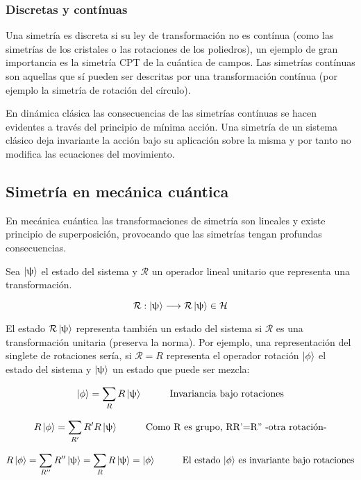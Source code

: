 \documentclass{article}
\begin{document}
\subsubsection{Discretas y contínuas}

Una simetría es discreta si su ley de transformación no es contínua (como las simetrías de los cristales o las rotaciones de los poliedros), un ejemplo de gran importancia es la simetría CPT de la cuántica de campos. Las simetrías contínuas son aquellas que sí pueden ser descritas por una transformación contínua (por ejemplo la simetría de rotación del círculo).

\smallskip
En dinámica clásica las consecuencias de las simetrías contínuas se hacen evidentes a través del principio de mínima acción. Una simetría de un sistema clásico deja invariante la acción bajo su aplicación sobre la misma y por tanto no modifica las ecuaciones del movimiento.

\subsection{Simetría en mecánica cuántica}

En mecánica cuántica las transformaciones de simetría son lineales y existe principio de superposición, provocando que las simetrías tengan profundas consecuencias.

Sea $\ket{\uppsi}$ el estado del sistema y $\mathcal{R}$ un operador lineal unitario que representa una transformación.

$$\mathcal{R}:\ket{\uppsi}\longrightarrow \mathcal{R}\ket{\uppsi}\in \mathcal{H}$$

El estado $\mathcal{R}\ket{\uppsi}$ representa también un estado del sistema si $\mathcal{R}$ es una transformación unitaria (preserva la norma). Por ejemplo, una representación del singlete de rotaciones sería, si $\mathcal{R}=R$ representa el operador rotación $\ket{\phi}$ el estado del sistema y $\ket{\uppsi}$ un estado que puede ser mezcla:

$$\ket{\phi} = \sum _R R\ket{\uppsi} \hspace{1cm} \text{Invariancia bajo rotaciones}$$

$$R\ket{\phi}=\sum _{R'}R'R\ket{\uppsi} \hspace{1cm} \text{Como R es grupo, RR'=R'' -otra rotación-}$$

$$R\ket{\phi}= \sum _{R''}R''\ket{\uppsi}=\sum _R R\ket{\uppsi}=\ket{\phi} \hspace{1cm} \text{El estado $\ket{\phi}$ es invariante bajo rotaciones}$$
\end{document}
